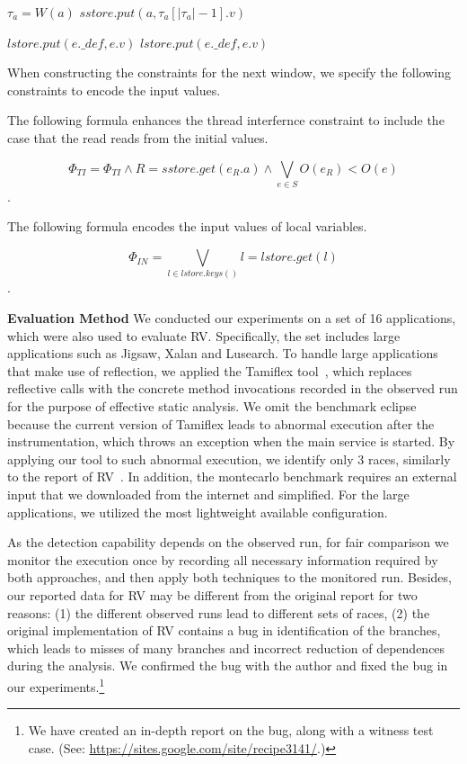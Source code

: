 \begin{algorithmic}[3]
	\State $\tau_a=W(a)$
	\State $sstore.put(a,\tau_a[|\tau_a|-1].v)$ 
	\EndFor
\end{algorithmic}

\begin{algorithmic}[3]
	\State $ lstore.put(e.\_def, e.v)$
	\Else
	\State $ lstore.put(e.\_def, e.v)$
	\EndIf
	\EndIf 
	\EndFor
\end{algorithmic}


When constructing the constraints for the next window, we specify the following constraints to encode the input values.

The following formula enhances the thread interfernce constraint to include the case that the read reads from the initial values. 

$$\Phi_{TI}=\Phi_{TI} \wedge  R=sstore.get(e_R.a) \wedge \bigvee_{e\in S} O(e_R)<O(e)$$.

The following formula encodes the input values of local variables. 

$$\Phi_{IN}=\bigvee_{l\in lstore.keys()} l=lstore.get(l)$$.


{\bf Evaluation Method} We conducted our experiments on a set of 16 applications, which were also used to evaluate {\sf RV}. Specifically, the set includes large applications such as {\sf Jigsaw}, {\sf Xalan} and {\sf Lusearch}. To handle large applications that make use of reflection, we applied the {\sf Tamiflex} tool~\cite{}, which replaces reflective calls with the concrete method invocations recorded in the observed run for the purpose of effective static analysis.  We omit the benchmark {\sf eclipse} because the current version of {\sf Tamiflex}  leads to abnormal execution after the instrumentation, which throws an exception when the main service is started. By applying our tool to such abnormal execution, we identify only 3 races, similarly to the report of RV~\cite{}.
In addition, the {\sf montecarlo} benchmark requires an external input that we downloaded from the internet and simplified. For the large applications, we utilized the most lightweight available configuration.


 As the detection capability  depends on the observed run, for fair comparison we monitor the execution once by recording all necessary information required by both approaches, and then apply both techniques to the monitored run. Besides, our reported data for RV may be different from the original report for two reasons: (1) the different observed runs lead to different sets of races, (2) the original implementation of RV contains a bug in identification of the branches, which leads to  misses of many branches and  incorrect reduction of dependences during the analysis. We confirmed the bug with the author and fixed the bug in our experiments.\footnote{We have created an in-depth report on the bug, along with a witness test case. (See:  \url{https://sites.google.com/site/recipe3141/}.)}


